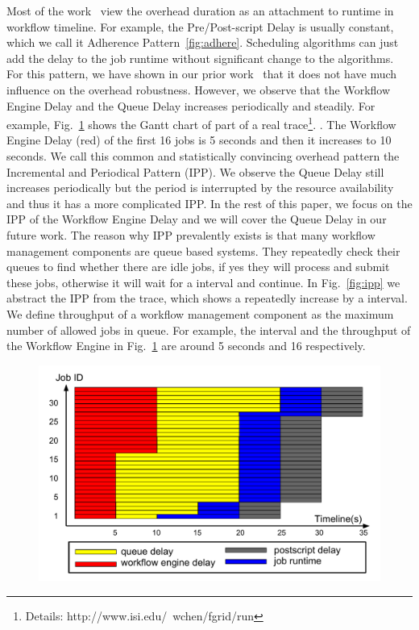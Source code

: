 \documentclass[final]{IEEEtran}
\begin{document}
Most of the work~\cite{Dong2010, Yang03} view the overhead duration as an attachment to runtime in workflow timeline. For example, the Pre/Post-script Delay is usually constant, which we call it Adherence Pattern~\ref{fig:adhere}. Scheduling algorithms can just add the delay to the job runtime without significant change to the algorithms. For this pattern, we have shown in our prior work~\cite{Chen} that it does not have much influence on the overhead robustness. 
However, we observe that the Workflow Engine Delay and the Queue Delay increases periodically and steadily. For example, Fig.~\ref{fig:trace} shows the Gantt chart of part of a real trace\footnote{Details: http://www.isi.edu/\string~wchen/fgrid/run}. 
. The Workflow Engine Delay (red) of the first 16 jobs is 5 seconds and then it increases to 10 seconds. 
We call this common and statistically convincing overhead pattern the Incremental and Periodical Pattern (IPP). We observe the Queue Delay still increases periodically but the period is interrupted by the resource availability and thus it has a more complicated IPP. In the rest of this paper, we focus on the IPP of the Workflow Engine Delay and we will cover the Queue Delay in our future work. 
The reason why IPP prevalently exists is that many workflow management components are queue based systems. They repeatedly check their queues to find whether there are idle jobs, if yes they will process and submit these jobs, otherwise it will wait for a interval and continue. In Fig.~\ref{fig:ipp} we abstract the IPP from the trace, which shows a repeatedly increase by a interval. We define throughput of a workflow management component as the maximum number of allowed jobs in queue. For example, the interval and the throughput of the Workflow Engine in Fig.~\ref{fig:trace} are around 5 seconds and 16 respectively. 


\begin{figure}[htb]
\centering
 \includegraphics[width=1\linewidth]{figure/trace.pdf}
  \label{fig:trace}
  \vspace{-10pt}
\end{figure}
\end{document}
